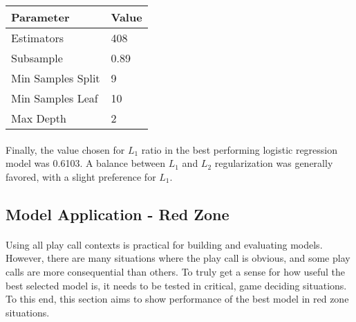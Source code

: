 \documentclass[11pt]{article}
\begin{document}
\begin{multicols*}{2}
        \begin{center}
            \begin{tabular}{|| m{3.25cm} | m{3cm}||}
                \hline
                \textbf{Parameter} & \textbf{Value}  \\
                \hline\hline
                Estimators & 408  \\
                \hline
                Subsample & 0.89 \\
                \hline
                Min Samples Split & 9 \\
                \hline
                Min Samples Leaf & 10 \\
                \hline
                Max Depth & 2 \\
                \hline
                
            \end{tabular}
            \end{center}


            \paragraph{}
                Finally, the value chosen for $L_1$ ratio in the best performing logistic regression model was 0.6103. 
                A balance between $L_1$ and $L_2$ regularization was generally favored, with a slight preference for $L_1$. 

                    
        \subsection{Model Application - Red Zone}
            \paragraph{}
                Using all play call contexts is practical for building and evaluating models. 
                However, there are many situations where the play call is obvious, and some play calls are more consequential than others.
                To truly get a sense for how useful the best selected model is, it needs to be tested in critical, game deciding situations. 
                To this end, this section aims to show performance of the best model in red zone situations. 
            
            \vspace{-10pt}


\end{multicols*}
\end{document}
